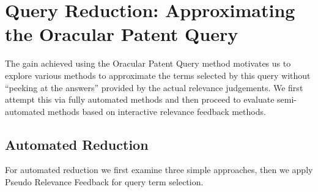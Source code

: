 \section{Query Reduction: Approximating the Oracular Patent Query}
\label{sec: QR}
The gain achieved using the Oracular Patent Query method motivates us to explore various methods to approximate the terms
selected by this query without ``peeking at the answers'' provided by
the actual relevance judgements.  We first attempt this via fully
automated methods and then proceed to evaluate semi-automated methods
based on interactive relevance feedback methods.
\subsection{Automated Reduction}
\label{AutomatedReduction}
For automated reduction we first examine three simple approaches, then we apply Pseudo Relevance Feedback for query term selection.  
